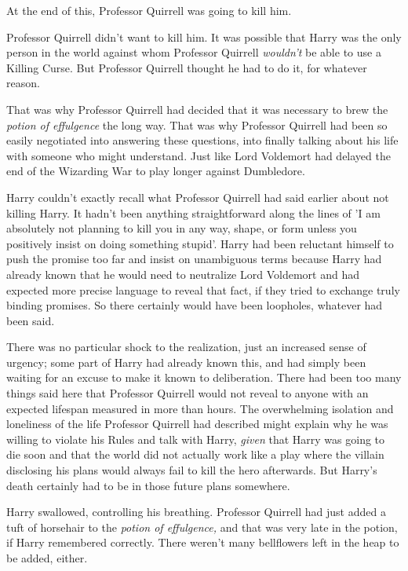At the end of this, Professor Quirrell was going to kill him.

Professor Quirrell didn’t want to kill him. It was possible that Harry was the only person in the world against whom Professor Quirrell \emph{wouldn’t} be able to use a Killing Curse. But Professor Quirrell thought he had to do it, for whatever reason.

That was why Professor Quirrell had decided that it was necessary to brew the \emph{potion of effulgence} the long way. That was why Professor Quirrell had been so easily negotiated into answering these questions, into finally talking about his life with someone who might understand. Just like Lord Voldemort had delayed the end of the Wizarding War to play longer against Dumbledore.

Harry couldn’t exactly recall what Professor Quirrell had said earlier about not killing Harry. It hadn’t been anything straightforward along the lines of ’I am absolutely not planning to kill you in any way, shape, or form unless you positively insist on doing something stupid’. Harry had been reluctant himself to push the promise too far and insist on unambiguous terms because Harry had already known that he would need to neutralize Lord Voldemort and had expected more precise language to reveal that fact, if they tried to exchange truly binding promises. So there certainly would have been loopholes, whatever had been said.

There was no particular shock to the realization, just an increased sense of urgency; some part of Harry had already known this, and had simply been waiting for an excuse to make it known to deliberation. There had been too many things said here that Professor Quirrell would not reveal to anyone with an expected lifespan measured in more than hours. The overwhelming isolation and loneliness of the life Professor Quirrell had described might explain why he was willing to violate his Rules and talk with Harry, \emph{given} that Harry was going to die soon and that the world did not actually work like a play where the villain disclosing his plans would always fail to kill the hero afterwards. But Harry’s death certainly had to be in those future plans somewhere.

Harry swallowed, controlling his breathing. Professor Quirrell had just added a tuft of horsehair to the \emph{potion of effulgence,} and that was very late in the potion, if Harry remembered correctly. There weren’t many bellflowers left in the heap to be added, either.

